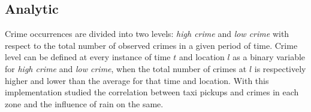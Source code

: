 \documentclass{sigkddExp}
\begin{document}
\subsection{Analytic}

Crime occurrences are divided into two levels: \textit{high crime} and  \textit{low crime} with respect to the total number of observed crimes in a given period of time.
Crime level can be defined at every instance of time $t$ and location $l$ as a binary variable for \textit{high crime} and \textit{low crime}, when the total number of crimes at $l$ is respectively higher and lower than the average for that time and location. With this implementation studied the correlation between taxi pickups and crimes in each zone and the influence of rain on the same.











\end{document}
